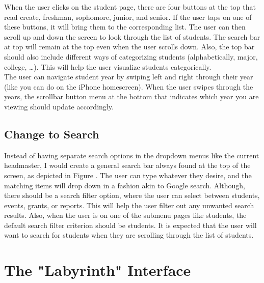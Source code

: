 \documentclass{article}
\begin{document}
When the user clicks on the student page, there are four buttons at the top that read create, freshman, sophomore, junior, and senior.  If the user taps on one of these buttons, it will bring them to the corresponding list.  The user can then scroll up and down the screen to look through the list of students.  The search bar at top will remain at the top even when the user scrolls down.   Also, the top bar should also include different ways of categorizing students (alphabetically, major, college, …).  This will help the user visualize students categorically.\\

The user can navigate student year by swiping left and right through their year (like you can do on the iPhone homescreen).  When the user swipes through the years, the scrollbar button menu at the bottom that indicates which year you are viewing should update accordingly.


\subsection{Change to Search}

Instead of having separate search options in the dropdown menus like the current headmaster, I would create a general search bar always found at the top of the screen, as depicted in Figure .  The user can type whatever they desire, and the matching items will drop down in a fashion akin to Google search.  Although, there should be a search filter option, where the user can select between students, events, grants, or reports.  This will help the user filter out any unwanted search results.  Also, when the user is on one of the submenu pages like students, the default search filter criterion should be students.  It is expected that the user will want to search for students when they are scrolling through the list of students.


\section{The "Labyrinth" Interface}
\end{document}
